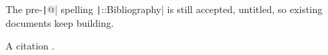 The pre-\texttt|@| spelling \texttt|::Bibliography| is still accepted, untitled, so
existing documents keep building.

A citation \citep{Quine:1948}.




